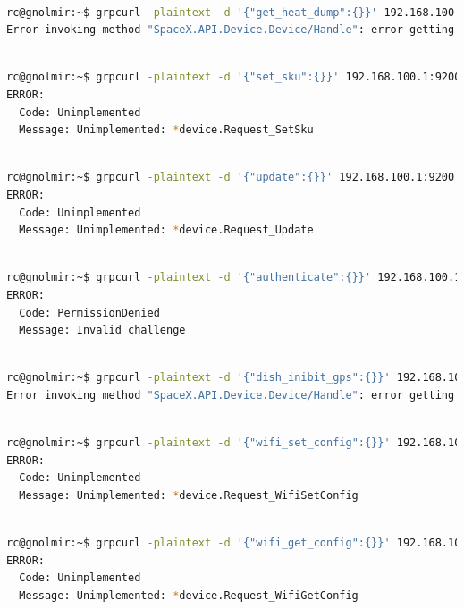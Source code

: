 \documentclass[IN,11pt,twoside,openright,bachelor,english]{tumthesis}
\begin{document}
 \begin{lstlisting}[language=bash,basicstyle=\tiny]

rc@gnolmir:~$ grpcurl -plaintext -d '{"get_heat_dump":{}}' 192.168.100.1:9200 SpaceX.API.Device.Device/Handle
Error invoking method "SpaceX.API.Device.Device/Handle": error getting request data: message type SpaceX.API.Device.Request has no known field named get_heat_dump
\end{lstlisting}
\begin{lstlisting}[language=bash,basicstyle=\tiny]

rc@gnolmir:~$ grpcurl -plaintext -d '{"set_sku":{}}' 192.168.100.1:9200 SpaceX.API.Device.Device/Handle
ERROR:
  Code: Unimplemented
  Message: Unimplemented: *device.Request_SetSku
 \end{lstlisting}
\begin{lstlisting}[language=bash,basicstyle=\tiny]

rc@gnolmir:~$ grpcurl -plaintext -d '{"update":{}}' 192.168.100.1:9200 SpaceX.API.Device.Device/Handle
ERROR:
  Code: Unimplemented
  Message: Unimplemented: *device.Request_Update
\end{lstlisting}
\begin{lstlisting}[language=bash,basicstyle=\tiny]

rc@gnolmir:~$ grpcurl -plaintext -d '{"authenticate":{}}' 192.168.100.1:9200 SpaceX.API.Device.Device/Handle
ERROR:
  Code: PermissionDenied
  Message: Invalid challenge
\end{lstlisting}
\begin{lstlisting}[language=bash,basicstyle=\tiny]

rc@gnolmir:~$ grpcurl -plaintext -d '{"dish_inibit_gps":{}}' 192.168.100.1:9200 SpaceX.API.Device.Device/Handle
Error invoking method "SpaceX.API.Device.Device/Handle": error getting request data: message type SpaceX.API.Device.Request has no known field named dish_inibit_gps
\end{lstlisting}
\begin{lstlisting}[language=bash,basicstyle=\tiny]

rc@gnolmir:~$ grpcurl -plaintext -d '{"wifi_set_config":{}}' 192.168.100.1:9200 SpaceX.API.Device.Device/Handle
ERROR:
  Code: Unimplemented
  Message: Unimplemented: *device.Request_WifiSetConfig
\end{lstlisting}
\begin{lstlisting}[language=bash,basicstyle=\tiny]

rc@gnolmir:~$ grpcurl -plaintext -d '{"wifi_get_config":{}}' 192.168.100.1:9200 SpaceX.API.Device.Device/Handle
ERROR:
  Code: Unimplemented
  Message: Unimplemented: *device.Request_WifiGetConfig
\end{lstlisting}
\end{document}
